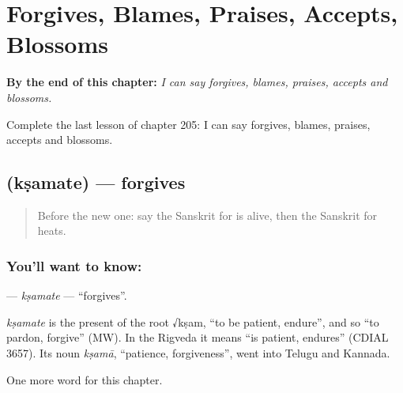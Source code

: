 
\chapter{Forgives, Blames, Praises, Accepts, Blossoms}
\label{ch:sa-forgives-blames-praises-accepts-blossoms}

\begin{chapteropening}
\textbf{By the end of this chapter:} \emph{I can say forgives, blames, praises, accepts and blossoms.}

Complete the last lesson of chapter 205: I can say forgives, blames, praises, accepts and blossoms.
\end{chapteropening}

\section[\texorpdfstring{\sk{क्षमते} (kṣamate)}{क्षमते (kṣamate)}]{ (kṣamate) — forgives}

\label{lesson:SA-C205-ksamate}



\begin{quote}
Before the new one: say the Sanskrit for is alive, then the Sanskrit for heats.
\end{quote}

\subsection*{You'll want to know: }
\textbf{} — \emph{kṣamate} — \textquotedblleft{}forgives\textquotedblright{}.

\begin{cousinweb}
\emph{kṣamate} is the present of the root √kṣam, \textquotedblleft{}to be patient, endure\textquotedblright{}, and so \textquotedblleft{}to pardon, forgive\textquotedblright{} (MW). In the Rigveda it means \textquotedblleft{}is patient, endures\textquotedblright{} (CDIAL 3657). Its noun \emph{kṣamā}, \textquotedblleft{}patience, forgiveness\textquotedblright{}, went into Telugu and Kannada.
\end{cousinweb}

\begin{grammarlens}[title={What you've built}]
One more word for this chapter.
\end{grammarlens}

